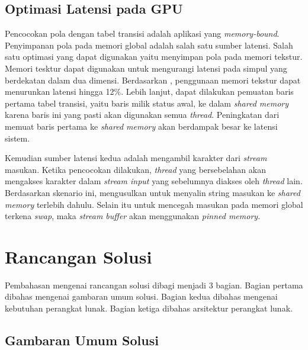      \subsection{Optimasi Latensi pada GPU}
      
      Pencocokan pola dengan tabel transisi adalah aplikasi yang \emph{memory-bound}. Penyimpanan pola pada memori global adalah salah satu sumber latensi. Salah satu optimasi yang dapat digunakan yaitu menyimpan pola pada memori tekstur. Memori tesktur dapat digunakan untuk mengurangi latensi pada simpul yang berdekatan dalam dua dimensi. Berdasarkan \cite{lin2013}, penggunaan memori tekstur dapat menurunkan latensi hingga 12\%. Lebih lanjut, dapat dilakukan pemuatan baris pertama tabel transisi, yaitu baris milik status awal, ke dalam \emph{shared memory} karena baris ini yang pasti akan digunakan semua \emph{thread}. Peningkatan dari memuat baris pertama ke \emph{shared memory} akan berdampak besar ke latensi sistem.
      
      
      Kemudian sumber latensi kedua adalah mengambil karakter dari \emph{stream} masukan. Ketika pencocokan dilakukan, \emph{thread} yang bersebelahan akan mengakses karakter dalam \emph{stream input} yang sebelumnya diakses oleh \emph{thread} lain. Berdasarkan skenario ini, \cite{lin2013} mengusulkan untuk menyalin string masukan ke \emph{shared memory} terlebih dahulu. Selain itu untuk mencegah masukan pada memori global terkena \emph{swap}, maka \emph{stream buffer} akan menggunakan \emph{pinned memory}. 

  \section{Rancangan Solusi}

    Pembahasan mengenai rancangan solusi dibagi menjadi 3 bagian. Bagian pertama dibahas mengenai gambaran umum solusi. Bagian kedua dibahas mengenai kebutuhan perangkat lunak. Bagian ketiga dibahas arsitektur perangkat lunak. 

    \subsection{Gambaran Umum Solusi}

